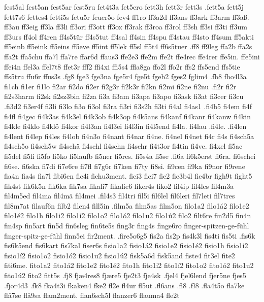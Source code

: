 fest5al
fest5an
fest5ar
fest5ru
fet4t3a
fet5ero
fett3h
fett3r
fett3s
.fett5a
fett5j
fett7s6
fettes4
fetti5s
fetu5r
feuer5o
fev4
ff1ro
ff3a2d
ff3ans
ff3ark
ff3arm
ff3aß.
ff3au
ff3eig
ff3la
ff3li
ff3ori
ff3ott
ff3ox
ff3rak
ff3roa
ff3rol
ff3sh
ff3si
ff3ti
ff3um
ff3urs
ff4ol
ff4ren
ff4s5tür
ff4s5tut
ff4sal
ff4sin
ff4spu
ff4stau
ff4sto
ff4sum
ff5akti
ff5einb
ff5eink
ff5eins
ff5eve
ff5int
ff5lek
ff5sl
ff5t4
ff6s5tuer
.ff8
ff9leg
ffa2b
ffa2s
ffa2t
ffa5chu
ffa7l
ffa7re
ffar6d
ffaus3
ffe2e3
ffe2m
ffe2t
ffe4rec
ffe4rer
ffe5in.
ffe5ini
ffei4n
ffel3a
ffel7t8
ffet3r
fff2
ffi4xi
ffi5s4
ffla8ga
ffo2l
ffo2r
ffs2
ffs5end
ffs5tie
ffs5tru
ffu6r
ffus3s
.fg8
fge3
fge3na
fge5r4
fge5t
fgeb2
fges2
fglim4
.fh8
fho4l3a
fi1ch
fi1er
fi1lo
fi2ar
fi2do
fi2er
fi2g3r
fi2k3r
fi2kn
fi2mi
fi2ne
fi2nu
.fi2r
fi2r
fi2s3harm
fi2sk
fi2sz3bin
fi2za
fi3a
fi3am
fi3apa
fi3apo
fi3ask
fi3at
fi3cer
fi3cu
.fi3d2
fi3er4f
fi3li
fi3lo
fi3o
fi3ol
fi3ra
fi3ri
fi3s2h
fi3ti
fi4al
fi4as1
.fi4b5
fi4em
fi4f
fi4fl
fi4gec
fi4k3as
fi4k3el
fi4k3ob
fi4k3op
fi4k5ans
fi4kanf
fi4kanr
fi4kanw
fi4kin
fi4kle
fi4klo
fi4klö
fi4kor
fi4l3an
fi4l3ei
fi4l3in
fi4l5end
fi4la.
fi4lau
.fi4le.
.fi4len
fi4lent
fi4lep
fi4les
fi4lob
fi4n3o
fi4nant
fi4nar
fi4ne.
fi4nel
fi4net
fi4r
fi4s
fi4sch5a
fi4sch5o
fi4sch5w
fi4schä
fi4schl
fi4schn
fi4schr
fi4t3or
fi4tin
fi4ve.
fi4xel
fi5ac
fi5del
fi5fi
fi5fo
fi5ko
fi5laufb
fi5ner
fi5res.
fi5s4a
fi5se
.fi6a
fi6k5erst
fi6ra.
fi6schei
fi6se.
fi6ska
fi7di
fi7e6re
fi7fl
fi7g6r
fi7ken
fi7ty
fi8si.
fi9cen
fi9ka
fi9nor
fi9rene
fia4n
fia4s
fia7l
fibi6en
fic4i
fichu3ment.
fici3
fici7
fie2
fie3b4l
fie4br
figh9t
fight5
fik4st
fik6k5n
fik6ka
fik7sa
fikali7
fikalie6
fiker4s
fiko2
fil4ip
fil4les
fil4m3a
fil4m5ed
fil4ma
fil4mä
fil4mei
.fil4s3
fil4tri
fil5i
fil6lel
fil6leri
fil7leti
fil7tres
fil8m7at
filauf6n
filb2
filen4
fill5in
.film5a
film5as
film5on
filo1a2
filo1á2
filo1e2
filo1é2
filo1h
filo1i2
filo1í2
filo1o2
filo1ó2
filo1u2
filo1ú2
filo2
filt6re
fin2d5
fin4n
fin4sp
fin5art
fin5d
fin6sleg
fin6te5s
fing3r
fing4s
finge6ro
finger-spitzen-ge-fühl
finger-spitz-ge-fühl
finn5ei
fir2ment.
.fire5o6g5
fis2a
fis2p
fis4k3l
fis4ti
fis5ti
.fis6k
fis6k5end
fis6kart
fis7kal
fiser6s
fisio1a2
fisio1á2
fisio1e2
fisio1é2
fisio1h
fisio1i2
fisio1í2
fisio1o2
fisio1ó2
fisio1u2
fisio1ú2
fisk5a6d
fisk5and
fiste4
fit3el
fite2
fiti6me.
fito1a2
fito1á2
fito1e2
fito1é2
fito1h
fito1i2
fito1í2
fito1o2
fito1ó2
fito1u2
fito1ú2
fito2
fitt5s
.fj8
fjæ4res8
fjære5
fje2t3
fje4sk
.fjel4
fjel6lend
fjer5ne
fjes5
.fjor4d3
.fk8
fka4t3i
fkaken4
fke2
fl2e
fl4ur
fl5ut
.fl6ans
.fl8
.fł8
.fla4t5o
fla7ke
flå7se
flå9sa
flam2ment.
flan6sch5l
flanzer6
flauma4
fle2t
